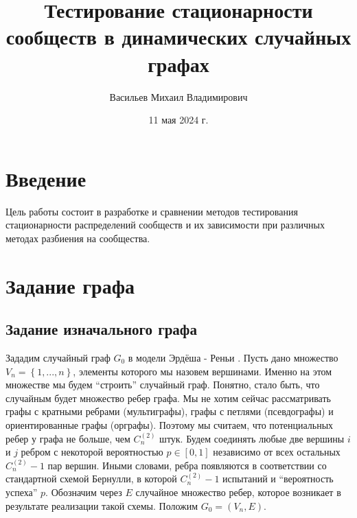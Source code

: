 \documentclass[a4paper,12pt]{article}
\begin{document}
\title{Тестирование стационарности сообществ в динамических случайных графах}



\author{Васильев Михаил Владимирович}


\date{11 мая 2024 г.}%
             



\maketitle

\section{Введение}

	Цель работы состоит в разработке и сравнении методов тестирования стационарности распределений сообществ и их зависимости при различных методах разбиения на сообщества.

	
	
\section{Задание графа}

\subsection{Задание изначального графа}

	Зададим случайный граф $G_{0}$ в модели Эрдёша - Реньи \cite{book1}.
Пусть дано множество $V_{n} = \left\{ 1,...,n \right\}$, элементы которого мы назовем вершинами. Именно на этом множестве мы будем “строить” случайный граф. Понятно, стало быть, что случайным будет множество ребер графа. Мы не хотим сейчас рассматривать графы с кратными ребрами (мультиграфы), графы с петлями (псевдографы) и ориентированные графы (орграфы). Поэтому мы считаем, что потенциальных ребер у графа не больше, чем $C_{n}^{(2)}$ штук. Будем соединять любые две вершины $i$ и $j$ ребром с некоторой вероятностью $p \in [0, 1]$ независимо от всех остальных $C_{n}^{(2)} - 1$ пар вершин. Иными словами, ребра появляются в соответствии со стандартной схемой Бернулли, в которой $C_{n}^{(2)} - 1$ испытаний и “вероятность успеха” $p$. Обозначим через $E$ случайное множество ребер, которое возникает в результате реализации такой схемы. Положим $G_{0} = (V_{n}, E)$.
\end{document}
